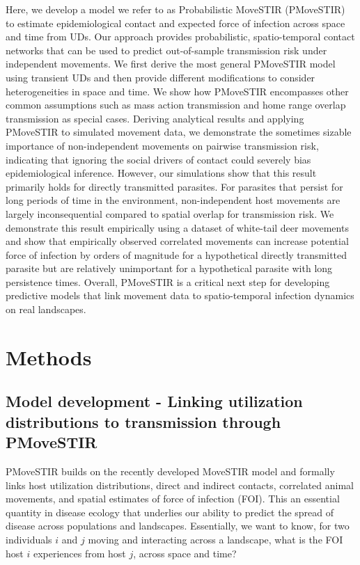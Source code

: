 \documentclass[letterpaper]{article}
\begin{document}
Here, we develop a model we refer to as Probabilistic MoveSTIR (PMoveSTIR) to estimate epidemiological contact and expected force of infection across space and time from UDs. Our approach provides probabilistic, spatio-temporal contact networks that can be used to predict out-of-sample transmission risk under independent movements. We first derive the most general PMoveSTIR model using transient UDs and then provide different modifications to consider heterogeneities in space and time. We show how PMoveSTIR encompasses other common assumptions such as mass action transmission and home range overlap transmission as special cases. Deriving analytical results and applying PMoveSTIR to simulated movement data, we demonstrate the sometimes sizable importance of non-independent movements on pairwise transmission risk, indicating that ignoring the social drivers of contact could severely bias epidemiological inference. However, our simulations show that this result primarily holds for directly transmitted parasites. For parasites that persist for long periods of time in the environment, non-independent host movements are largely inconsequential compared to spatial overlap for transmission risk. We demonstrate this result empirically using a dataset of white-tail deer movements and show that empirically observed correlated movements can increase potential force of infection by orders of magnitude for a hypothetical directly transmitted parasite but are relatively unimportant for a hypothetical parasite with long persistence times.  Overall, PMoveSTIR is a critical next step for developing predictive models that link movement data to spatio-temporal infection dynamics on real landscapes.

\section*{Methods}

\subsection*{Model development - Linking utilization distributions to transmission through PMoveSTIR}

PMoveSTIR builds on the recently developed MoveSTIR model \citep{Wilber2022} and formally links host utilization distributions, direct and indirect contacts, correlated animal movements, and spatial estimates of force of infection (FOI). This an essential quantity in disease ecology that underlies our ability to predict the spread of disease across populations and landscapes. Essentially, we want to know, for two individuals $i$ and $j$ moving and interacting across a landscape, what is the FOI host $i$ experiences from host $j$, across space and time?  
\end{document}
